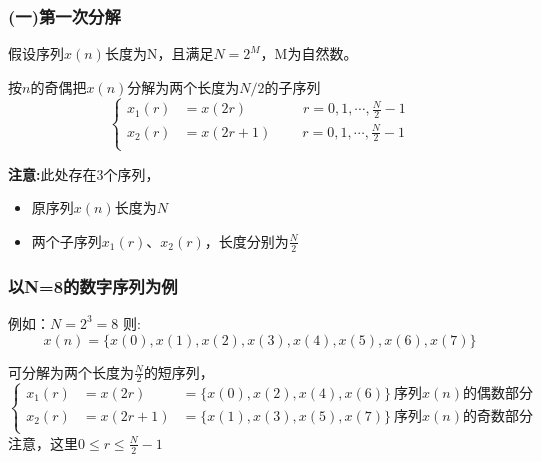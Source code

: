 \documentclass[notheorems,compress,mathserif,table]{beamer}
\begin{document}
\begin{frame}[shrink]\frametitle{(一)第一次分解}
假设序列$x(n)$长度为N，且满足$N=2^{M}$，M为自然数。\par
按$n$的奇偶把$x(n)$分解为两个长度为$N/2$的子序列%
\begin{equation*}
\left\{ \begin{aligned}
    x_{1}(r) &= x(2r)\quad\quad\qquad r=0,1,\cdots,\mbox{$\frac{N}{2}-1$} \\
    x_{2}(r) &= x(2r+1)\quad\:\quad r=0,1,\cdots,\mbox{$\frac{N}{2}-1$} \\
\end{aligned} \right.
\end{equation*}


\textbf{注意:}\qquad  此处存在3个序列，
\begin{itemize}
  \item   原序列$x(n)$长度为$N$ \newline
  \item  两个子序列$x_{1}(r)$、$x_{2}(r)$，长度分别为$\frac{N}{2}$
\end{itemize}
\end{frame}
%
%
%
\begin{frame}[shrink]\frametitle{以N=8的数字序列为例 }

例如：$N = 2^{3} =8 $ 则:
 $$x(n) = \{x(0),x(1),x(2),x(3),x(4),x(5),x(6),x(7)\}$$

可分解为两个长度为$\frac{N}{2}$的短序列，
\begin{equation*} \label{eq:2}
\left\{ \begin{aligned}
    x_{1}(r) &=x(2r)  &= \{x(0),x(2),x(4),x(6)\} \:\mbox{序列$x(n)$的偶数部分}\\
    x_{2}(r) &=x(2r+1)&= \{x(1),x(3),x(5),x(7)\} \:\mbox{序列$x(n)$的奇数部分}\\
\end{aligned} \right.
\end{equation*}
注意，这里\textbf{$0\leq r\leq\frac{N}{2}-1$}
\end{frame}
\end{document}
